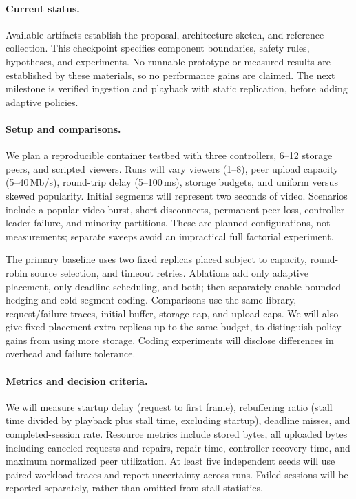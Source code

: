 \documentclass[letterpaper,twocolumn,10pt]{article}
\begin{document}
\paragraph{Current status.}
Available artifacts establish the proposal, architecture sketch, and reference collection. This checkpoint specifies component boundaries, safety rules, hypotheses, and experiments. No runnable prototype or measured results are established by these materials, so no performance gains are claimed. The next milestone is verified ingestion and playback with static replication, before adding adaptive policies.

\paragraph{Setup and comparisons.}
We plan a reproducible container testbed with three controllers, 6--12 storage peers, and scripted viewers. Runs will vary viewers (1--8), peer upload capacity (5--40\,Mb/s), round-trip delay (5--100\,ms), storage budgets, and uniform versus skewed popularity. Initial segments will represent two seconds of video. Scenarios include a popular-video burst, short disconnects, permanent peer loss, controller leader failure, and minority partitions. These are planned configurations, not measurements; separate sweeps avoid an impractical full factorial experiment.

The primary baseline uses two fixed replicas placed subject to capacity, round-robin source selection, and timeout retries. Ablations add only adaptive placement, only deadline scheduling, and both; then separately enable bounded hedging and cold-segment coding. Comparisons use the same library, request/failure traces, initial buffer, storage cap, and upload caps. We will also give fixed placement extra replicas up to the same budget, to distinguish policy gains from using more storage. Coding experiments will disclose differences in overhead and failure tolerance.

\paragraph{Metrics and decision criteria.}
We will measure startup delay (request to first frame), rebuffering ratio (stall time divided by playback plus stall time, excluding startup), deadline misses, and completed-session rate. Resource metrics include stored bytes, all uploaded bytes including canceled requests and repairs, repair time, controller recovery time, and maximum normalized peer utilization. At least five independent seeds will use paired workload traces and report uncertainty across runs. Failed sessions will be reported separately, rather than omitted from stall statistics.
\end{document}
